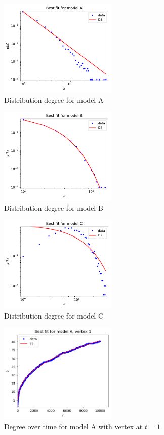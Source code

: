 \documentclass[a4paper]{article}
\begin{document}
\newpage

\begin{figure}[H]
		\centering
		\includegraphics[width=0.5\textwidth]{modelA/best_dd.pdf}
		\caption{Distribution degree for model A}
		\label{fig:all_dd_A}
\end{figure}
%
\begin{figure}[H]
		\centering
		\includegraphics[width=0.5\textwidth]{modelB/best_dd.pdf}
		\caption{Distribution degree for model B}
		\label{fig:all_dd_B}
\end{figure}
%
\begin{figure}[H]
		\centering
		\includegraphics[width=0.5\textwidth]{modelC/best_dd.pdf}
		\caption{Distribution degree for model C}
		\label{fig:all_dd_C}
\end{figure}
%
\begin{figure}[H]
    \centering
		\includegraphics[width=0.5\textwidth]{modelA/best_dt1.png}
		\caption{Degree over time for model A with vertex at $t=1$}
\end{figure}
\end{document}
